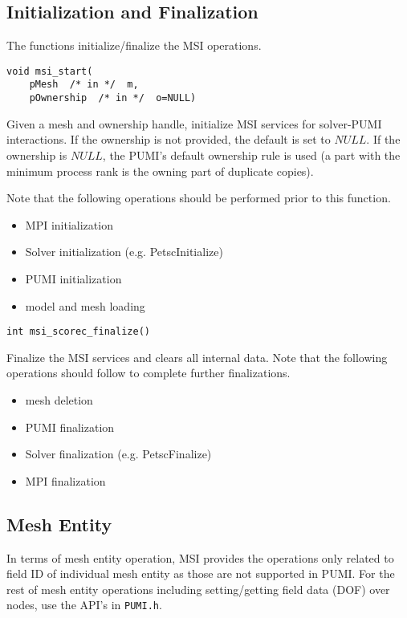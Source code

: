 \subsection{Initialization and Finalization}

The functions initialize/finalize the MSI operations.

\begin{verbatim}
void msi_start(
    pMesh  /* in */  m, 
    pOwnership  /* in */  o=NULL)
\end{verbatim}\vspace{-.5cm}\hspace{1cm}
Given a mesh and ownership handle, initialize MSI services for solver-PUMI interactions. If the ownership is not provided, the default is set to $NULL$. If the ownership is $NULL$, the PUMI's default ownership rule is used (a part with the minimum process rank is the owning part of duplicate copies). 

Note that the following operations should be performed prior to this function.
\begin{itemize}
\item MPI initialization
\item Solver initialization (e.g. PetscInitialize)
\item PUMI initialization 
\item model and mesh loading
\end{itemize}

\begin{verbatim}
int msi_scorec_finalize()
\end{verbatim}\vspace{-.5cm}\hspace{1cm}
Finalize the MSI services and clears all internal data. Note that the following operations should follow to complete further finalizations.
\begin{itemize}
\item mesh deletion
\item PUMI finalization
\item Solver finalization (e.g. PetscFinalize)
\item MPI finalization
\end{itemize}

\subsection{Mesh Entity}
In terms of mesh entity operation, MSI provides the operations only related to field ID of individual mesh entity as those are not supported in PUMI. For the rest of mesh entity operations including setting/getting field data (DOF) over nodes, use the API's in \texttt{PUMI.h}. 


